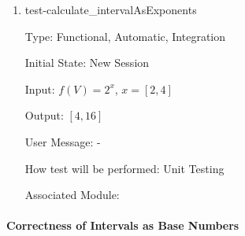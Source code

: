 \documentclass[12pt, titlepage]{article}
\begin{document}
\begin{enumerate}
	
	\item{test-calculate\_intervalAsExponents}
	
	Type: Functional, Automatic, Integration
	
	Initial State: New Session
	
	Input: $f(V) = 2^x$, $x = [2,4]$
	
	Output: $[4,16]$
	
	User Message: - 
	
	How test will be performed: Unit Testing
	
	Associated Module: \\
	
\end{enumerate}

\paragraph{Correctness of Intervals as Base Numbers}
\end{document}

